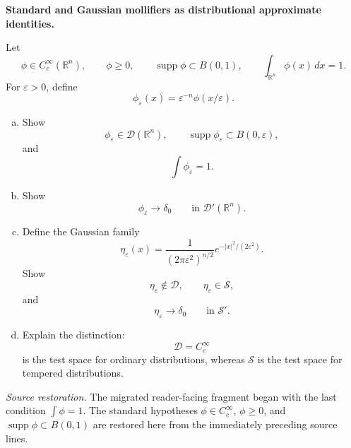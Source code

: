 \begin{problem}[CP-III-0025]
\label{prob:cp-iii-0025}
\textbf{Standard and Gaussian mollifiers as distributional approximate identities.}

Let
\[
\phi\in C_c^\infty(\mathbb R^n),
\qquad
\phi\ge0,
\qquad
\operatorname{supp}\phi\subset B(0,1),
\qquad
\int_{\mathbb R^n}\phi(x)\,dx=1.
\]
For \(\varepsilon>0\), define
\[
\phi_\varepsilon(x)
=
\varepsilon^{-n}
\phi(x/\varepsilon).
\]

\begin{enumerate}[(a)]
\item Show
\[
\phi_\varepsilon\in\mathcal D(\mathbb R^n),
\qquad
\operatorname{supp}\phi_\varepsilon
\subset B(0,\varepsilon),
\]
and
\[
\int\phi_\varepsilon=1.
\]

\item Show
\[
\phi_\varepsilon\to\delta_0
\qquad\text{in }\mathcal D'(\mathbb R^n).
\]

\item Define the Gaussian family
\[
\eta_\varepsilon(x)
=
\frac1{(2\pi\varepsilon^2)^{n/2}}
e^{-|x|^2/(2\varepsilon^2)}.
\]
Show
\[
\eta_\varepsilon\notin\mathcal D,
\qquad
\eta_\varepsilon\in\mathcal S,
\]
and
\[
\eta_\varepsilon\to\delta_0
\qquad\text{in }\mathcal S'.
\]

\item Explain the distinction:
\[
\mathcal D=C_c^\infty
\]
is the test space for ordinary distributions, whereas \(\mathcal S\) is
the test space for tempered distributions.
\end{enumerate}

\medskip
\noindent
\textit{Source restoration.}
The migrated reader-facing fragment began with the last condition
\(\int\phi=1\). The standard hypotheses
\(\phi\in C_c^\infty\), \(\phi\ge0\), and
\(\operatorname{supp}\phi\subset B(0,1)\) are restored here from the
immediately preceding source lines.
\end{problem}

